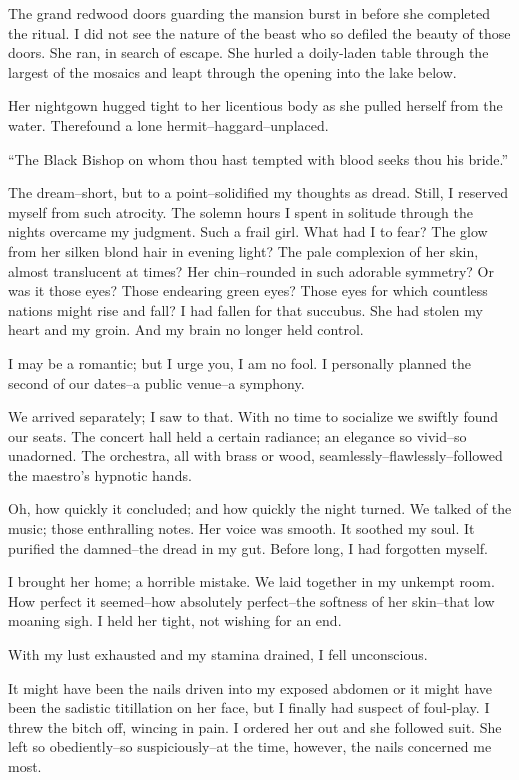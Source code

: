 \documentclass{article}
\begin{document}
\noindent %
The grand redwood doors guarding the mansion burst in
before she completed the ritual.
I did not see the nature of the beast who so defiled the
beauty of those doors.
She ran, in search of escape.
She hurled a doily-laden table through the largest
of the mosaics and leapt through the opening
into the lake below.


Her nightgown hugged tight to her licentious body
as she pulled herself from the water.
Therefound a lone hermit--haggard--unplaced.


``The Black Bishop on whom thou hast tempted
with blood seeks thou his bride.''
\vvvv


\noindent
The dream--short, but to a point--solidified my thoughts as dread.
Still, I reserved myself from such atrocity.
The solemn hours I spent in solitude through the nights
overcame my judgment.
Such a frail girl.
What had I to fear?
The glow from her silken blond hair in evening light?
The pale complexion of her skin, almost translucent at times?
Her chin--rounded in such adorable symmetry?
Or was it those eyes? Those endearing green eyes?
Those eyes for which countless nations might rise and fall?
I had fallen for that succubus.
She had stolen my heart and my groin.
And my brain no longer held control.
\VV


\noindent
I may be a romantic; but I urge you, I am no fool.
I personally planned the second of our dates--a public venue--a symphony.


We arrived separately; I saw to that.
With no time to socialize we swiftly found our seats.
The concert hall held a certain radiance; an elegance
so vivid--so unadorned.
The orchestra, all with brass or wood, seamlessly--flawlessly--followed
the maestro's hypnotic hands.


Oh, how quickly it concluded; and how quickly the night turned.
We talked of the music; those enthralling notes.
Her voice was smooth. It soothed my soul.
It purified the damned--the dread in my gut.
Before long, I had forgotten myself.


I brought her home; a horrible mistake.
We laid together in my unkempt room.
How perfect it seemed--how
absolutely perfect--the
softness of her skin--that
low moaning sigh.
I held her tight, not wishing for an end.
\VV


\noindent
With my lust exhausted and my stamina drained, I fell unconscious.
\VV


\noindent
It might have been the nails driven into my exposed abdomen
or it might have been the sadistic titillation on her face,
but I finally had suspect of foul-play.
I threw the bitch off, wincing in pain.
I ordered her out and she followed suit.
She left so obediently--so suspiciously--at
the time, however, the nails concerned me most.
\end{document}
